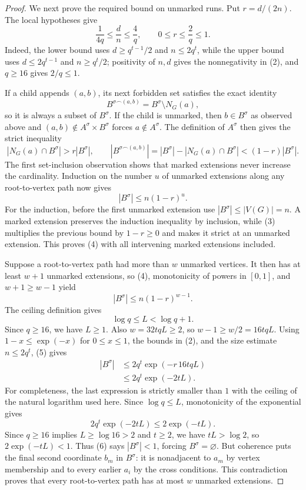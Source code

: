 \begin{proof}
We next prove the required bound on unmarked runs.  Put
$r=d/(2n)$.  The local hypotheses give
\[
 \frac1{4q}\leq\frac dn\leq\frac4q,
 \qquad 0\leq r\leq\frac2q\leq1. \tag{2}
\]
Indeed, the lower bound uses $d\geq q^{t-1}/2$ and $n\leq2q^t$, while
the upper bound uses $d\leq2q^{t-1}$ and $n\geq q^t/2$; positivity of
$n,d$ gives the nonnegativity in (2), and $q\geq16$ gives $2/q\leq1$.

If a child appends $(a,b)$, its next forbidden set satisfies the exact
identity
\[
 B^{\sigma\smallfrown(a,b)}=B^\sigma\setminus N_G(a),
\]
so it is always a subset of $B^\sigma$.  If the child is unmarked, then
$b\in B^\sigma$ as observed above and $(a,b)\notin A^\sigma\times
B^\sigma$ forces $a\notin A^\sigma$.  The definition of $A^\sigma$ then
gives the strict inequality
\[
 |N_G(a)\cap B^\sigma|>r|B^\sigma|,
 \qquad
 |B^{\sigma\smallfrown(a,b)}|
 =|B^\sigma|-|N_G(a)\cap B^\sigma|
 <(1-r)|B^\sigma|. \tag{3}
\]
The first set-inclusion observation shows that marked extensions never
increase the cardinality.  Induction on the number $u$ of unmarked
extensions along any root-to-vertex path now gives
\[
 |B^\sigma|\leq n(1-r)^u. \tag{4}
\]
For the induction, before the first unmarked extension use
$|B^\sigma|\leq|V(G)|=n$.  A marked extension preserves the induction
inequality by inclusion, while (3) multiplies the previous bound by
$1-r\geq0$ and makes it strict at an unmarked extension.  This proves (4)
with all intervening marked extensions included.

Suppose a root-to-vertex path had more than $w$ unmarked vertices.  It then
has at least $w+1$ unmarked extensions, so (4), monotonicity of powers in
$[0,1]$, and $w+1\geq w-1$ yield
\[
 |B^\sigma|\leq n(1-r)^{w-1}. \tag{5}
\]
The ceiling definition gives
\[
\log q\leq L<\log q+1.
\]
Since $q\geq16$, we have $L\geq1$.  Also $w=32tqL\geq2$,
so $w-1\geq w/2=16tqL$.  Using $1-x\leq\exp(-x)$ for $0\leq x\leq1$,
the bounds in (2), and the size estimate $n\leq2q^t$, (5) gives
\[
 \begin{aligned}
 |B^\sigma|
 &\leq 2q^t\exp\left(-r\,16tqL\right)\\
 &\leq 2q^t\exp(-2tL). \tag{6}
 \end{aligned}
\]
For completeness, the last expression is strictly smaller than $1$ with
the ceiling of the natural logarithm used here.  Since $\log q\leq L$,
monotonicity of the exponential gives
\[
2q^t\exp(-2tL)\leq2\exp(-tL).
\]
Since $q\geq16$ implies $L\geq\log16>2$ and $t\geq2$, we have
$tL>\log2$, so $2\exp(-tL)<1$.  Thus (6) says $|B^\sigma|<1$, forcing
$B^\sigma=\varnothing$.  But coherence puts the final second coordinate
$b_m$ in $B^\sigma$: it is nonadjacent to $a_m$ by vertex membership and
to every earlier $a_i$ by the cross conditions.  This contradiction proves
that every root-to-vertex path has at most $w$ unmarked extensions.


\end{proof}
